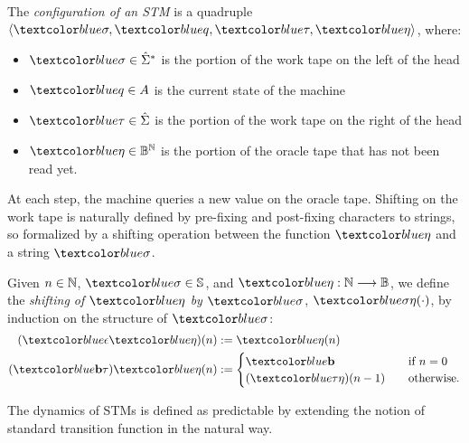 \begin{defn}\label{df:STMConfiguration}
The \emph{configuration of an STM}
is a quadruple $\langle \m{\sigma},
\m{q}, \m{\tau}, \m{\eta}\rangle$,
where:
\begin{itemize}
\itemsep0em
%
\item $\m{\sigma} \in \hat{\Sigma}^*$
is the portion of the work tape on the left of the head
%
\item $\m{q}\in A$ is the current state of the machine
%
\item $\m{\tau} \in \hat{\Sigma}$ is the portion of the
work tape on the right of the head
%
\item $\m{\eta} \in \Bool^\Nat$ is the portion
of the oracle tape that has not been read yet.
\end{itemize}
\end{defn}
%
%
\noindent
At each step, the machine queries a new value
on the oracle tape.
%
Shifting on the work tape is naturally defined by
pre-fixing and post-fixing characters to strings,
so formalized by a shifting operation
between the function $\m{\eta}$
and a string $\m{\sigma}$.



\begin{defn}\label{df:shifting}
Given $n\in \mathbb{N}$, $\m{\sigma} \in \Ss$, and
$\m{\eta}:\Nat \map \Bool$,
we define the \emph{shifting of $\m{\eta}$
by %
$\m{\sigma}$},
$\m{\sigma \eta}(\cdot)$,
by induction on the structure of $\m{\sigma}$:
\begin{align*}
(\m{\eepsilon} \m{\eta})(n) &:= \m{\eta}(n) \\
%
(\m{\bool \tau}) \m{\eta}(n) &:= \begin{cases}
\m{\bool} \ \ \ &\text{if } n=0 \\
(\m{\tau \eta})(n-1) \ \ \ &\text{otherwise.}
\end{cases}
\end{align*}
\end{defn}


The dynamics of STMs is defined
as predictable by extending the notion of standard
transition function in the natural way.


